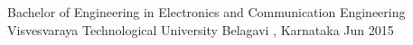 \begin{cventries}
  \cventry
    {Bachelor of Engineering in  Electronics and Communication Engineering} %
    {Visvesvaraya Technological University } %
    {Belagavi , Karnataka} %
    {Jun 2015} %
    {
      \begin{cvitems} %
       { }
      \end{cvitems}
    }
\end{cventries}
